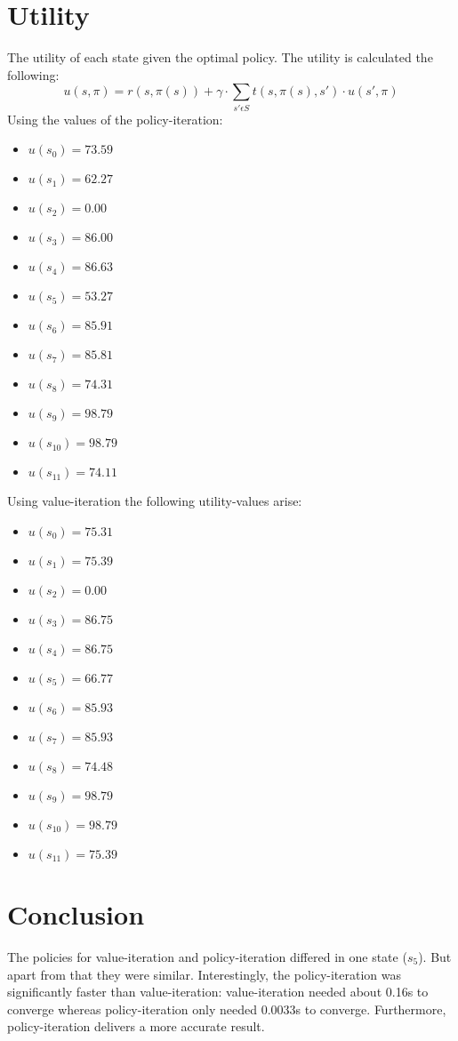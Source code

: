 \documentclass[a4paper]{article}
\begin{document}
\section{Utility}
The utility of each state given the optimal policy. The utility is calculated the following:
\begin{equation}
u(s,\pi) = r(s,\pi(s)) + \gamma \cdot \sum_{s' \epsilon S} t(s,\pi(s),s') \cdot u(s',\pi)
\end{equation}
Using the values of the policy-iteration:
\begin{multicols}{2}
\begin{itemize}
\item $u(s_0) = 73.59 $
\item $u(s_1) = 62.27 $
\item $u(s_2) = 0.00 $
\item $u(s_3) = 86.00 $
\item $u(s_4) = 86.63 $
\item $u(s_5) = 53.27 $
\item $u(s_6) = 85.91 $
\item $u(s_7) = 85.81 $
\item $u(s_8) = 74.31 $
\item $u(s_9) = 98.79 $
\item $u(s_{10}) = 98.79 $
\item $u(s_{11}) = 74.11 $
\end{itemize}
\end{multicols}

\noindent
Using value-iteration the following utility-values arise:
\begin{multicols}{2}
\begin{itemize}
\item $u(s_0) = 75.31 $
\item $u(s_1) = 75.39 $
\item $u(s_2) = 0.00 $
\item $u(s_3) = 86.75 $
\item $u(s_4) = 86.75 $
\item $u(s_5) = 66.77 $
\item $u(s_6) = 85.93 $
\item $u(s_7) = 85.93 $
\item $u(s_8) = 74.48 $
\item $u(s_9) = 98.79 $
\item $u(s_{10}) = 98.79 $
\item $u(s_{11}) = 75.39 $
\end{itemize}
\end{multicols}

\section{Conclusion}
The policies for value-iteration and policy-iteration differed in one state ($s_5$). But apart from that they were similar. Interestingly, the policy-iteration was significantly faster than value-iteration: value-iteration needed about 0.16s to converge whereas policy-iteration only needed 0.0033s to converge. Furthermore, policy-iteration delivers a more accurate result.
\end{document}
